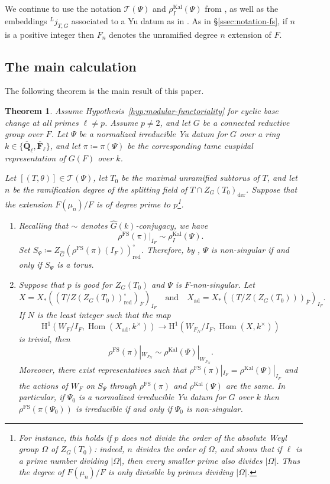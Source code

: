\documentclass[reqno]{amsart}
\numberwithin{equation}{subsection}
\newcommand{\F}{\mathbf{F}}
\newcommand{\Q}{\mathbf{Q}}
\newcommand{\ol}[1]{\overline{#1}}
\newcommand{\wh}[1]{\widehat{#1}}
\newcommand{\ld}{{}^L}
\newcommand\cT{\mathcal{T}}
\DeclareMathOperator{\Hom}{Hom}
\DeclareMathOperator{\ad}{ad}
\DeclareMathOperator{\FS}{FS}
\DeclareMathOperator{\red}{red}
\DeclareMathOperator{\Kal}{Kal}
\DeclareMathOperator{\der}{der}
\newcommand{\rH}{\ensuremath{\mathrm{H}}\xspace}
\newtheorem{thm}{Theorem}[subsection]
\theoremstyle{remark}
\numberwithin{equation}{subsection}
\numberwithin{figure}{subsection}
\begin{document}
We continue to use the notation $\cT(\Psi)$ and $\rho_I^{\Kal}(\Psi)$ from \cite[\S 7.2]{CF26a}, as well as the embeddings $\ld j_{T,G}$ associated to a Yu datum as in \cite[Definition~4.5.1]{CF26a}. As in \S\ref{ssec:notation-fs}, if $n$ is a positive integer then $F_n$ denotes the unramified degree $n$ extension of $F$. 

\subsection{The main calculation}

The following theorem is the main result of this paper.

\begin{thm}\label{thm:main-tame}
Assume Hypothesis~\ref{hyp:modular-functoriality} for cyclic base change at all primes $\ell \neq p$.
Assume $p \neq 2$, and let $G$ be a connected reductive group over $F$. Let $\Psi$ be a normalized irreducible Yu datum for $G$ over a ring $k \in \{\ol \Q_\ell,\ol\F_\ell\}$, and let $\pi \coloneqq \pi(\Psi)$ be the corresponding tame cuspidal representation of $G(F)$ over $k$.

Let $[(T, \theta)] \in \cT(\Psi)$, let $T_0$ be the maximal unramified subtorus of $T$, and let $n$ be the ramification degree of the splitting field of $T\cap Z_G(T_0)_{\der}$. Suppose that the extension $F(\mu_n)/F$ is of degree prime to $p$\footnote{For instance, this holds if $p$ does not divide the order of the absolute Weyl group $\Omega$ of $Z_G(T_0)$: indeed, $n$ divides the order of $\Omega$, and \cite[\S 2, Table 1]{Fin21} shows that if $\ell$ is a prime number dividing $|\Omega|$, then every smaller prime also divides $|\Omega|$. Thus the degree of $F(\mu_n)/F$ is only divisible by primes dividing $|\Omega|$.}.
\begin{enumerate}
    \item Recalling that $\sim$ denotes $\wh G(k)$-conjugacy, we have
    \[
    \rho^{\FS}(\pi)|_{I_F} \sim \rho^{\Kal}_I(\Psi).
    \]
    Set $S_\Psi \coloneqq Z_{\wh G}(\rho^{\FS}(\pi)(I_F))^\circ_{\red}$. Therefore, by \cite[Lemma~10.1.11(2)]{CF26a}, $\Psi$ is non-singular if and only if $S_\Psi$ is a torus.
    \item Suppose that $p$ is good for $Z_G(T_0)$ and $\Psi$ is $F$-non-singular. Let
    \[
    X = X_*((T/Z(Z_G(T_0))^\circ_{\red})_{\ol F})_{I_F} \quad \text{and} \quad X_{\ad} = X_*((T/Z(Z_G(T_0)))_{\ol F})_{I_F}. 
    \]
    If $N$ is the least integer such that the map
    \[
    \rH^1(W_F/I_F, \Hom(X_{\ad}, k^\times)) \to \rH^1(W_{F_N}/I_F, \Hom(X, k^\times))
    \]
    is trivial, then
    \[
    \rho^{\FS}(\pi)|_{W_{F_N}} \sim \rho^{\Kal}(\Psi)|_{W_{F_N}}.
    \]
    Moreover, there exist representatives such that $\rho^{\FS}(\pi)|_{I_F} = \rho^{\Kal}(\Psi)|_{I_F}$ and the actions of $W_F$ on $S_\Psi$ through $\rho^{\FS}(\pi)$ and $\rho^{\Kal}(\Psi)$ are the same. In particular, if $\Psi_0$ is a normalized irreducible Yu datum for $G$ over $k$ then $\rho^{\FS}(\pi(\Psi_0))$ is irreducible if and only if $\Psi_0$ is non-singular.
\end{enumerate}
\end{thm}
\end{document}
